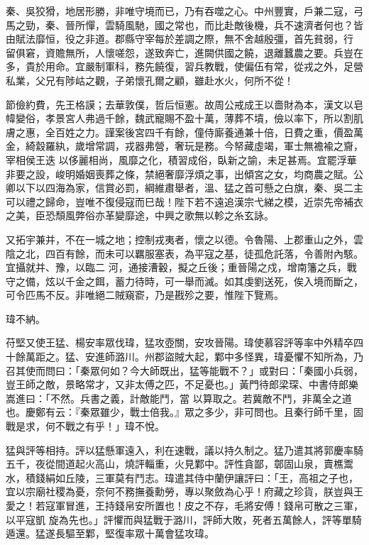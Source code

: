 \begin{pinyinscope}
 秦、吳狡猾，地居形勝，非唯守境而已，乃有吞噬之心。中州豐實，戶兼二寇，弓馬之勁，秦、晉所憚，雲騎風馳，國之常也，而比赴敵後機，兵不速濟者何也？皆由賦法靡恒，役之非道。郡縣守宰每於差調之際，無不舍越殷彊，首先貧弱，行
 留俱窘，資贍無所，人懷嗟怨，遂致奔亡，進闕供國之饒，退離蠶農之要。兵豈在多，貴於用命。宜嚴制軍科，務先饒復，習兵教戰，使偏伍有常，從戎之外，足營私業，父兄有陟岵之觀，子弟懷孔爾之顧，雖赴水火，何所不從！



 節儉約費，先王格謨；去華敦僕，哲后恒憲。故周公戒成王以嗇財為本，漢文以皂幃變俗，孝景宮人弗過千餘，魏武寵賜不盈十萬，薄葬不墳，儉以率下，所以割肌膚之惠，全百姓之力。謹案後宮四千有餘，僮侍廝養通兼十倍，日費之重，價盈萬金，綺縠羅紈，歲增常調，戎器弗營，奢玩是務。今帑藏虛竭，軍士無襜褕之齎，宰相侯王迭
 以侈麗相尚，風靡之化，積習成俗，臥新之諭，未足甚焉。宜罷浮華非要之設，峻明婚姻喪葬之條，禁絕奢靡浮煩之事，出傾宮之女，均商農之賦。公卿以下以四海為家，信賞必罰，綱維肅舉者，溫、猛之首可懸之白旗，秦、吳二主可以禮之歸命，豈唯不復侵寇而巳哉！陛下若不遠追漢宗弋綈之模，近崇先帝補衣之美，臣恐頹風弊俗亦革變靡途，中興之歌無以軫之糸玄詠。



 又拓宇兼并，不在一城之地；控制戎夷者，懷之以德。令魯陽、上郡重山之外，雲陰之北，四百有餘，而未可以羈服塞表，為平寇之基，徒孤危託落，令善附內駭。宜攝就并、豫，以臨二
 河，通接漕轂，擬之丘後；重晉陽之戍，增南籓之兵，戰守之備，炫以千金之餌，蓄力待時，可一舉而滅。如其虔劉送死，俟入境而斷之，可令匹馬不反。非唯絕二賊窺窬，乃是戡殄之要，惟陛下覽焉。



 瑋不納。



 苻堅又使王猛、楊安率眾伐瑋，猛攻壺關，安攻晉陽。瑋使慕容評等率中外精卒四十餘萬距之。猛、安進師潞川。州郡盜賊大起，鄴中多怪異，瑋憂懼不知所為，乃召其使而問曰：「秦眾何如？今大師既出，猛等能戰不？」或對曰：「秦國小兵弱，豈王師之敵，景略常才，又非太傅之匹，不足憂也。」黃門待郎梁琛、中書侍郎樂嵩進曰：「不然。兵書之義，計敵能鬥，當
 以算取之。若冀敵不鬥，非萬全之道也。慶鄭有云：『秦眾雖少，戰士倍我。』眾之多少，非可問也。且秦行師千里，固戰是求，何不戰之有乎！」瑋不悅。



 猛與評等相持。評以猛懸軍遠入，利在速戰，議以持久制之。猛乃遣其將郭慶率騎五千，夜從間道起火高山，燒評輜重，火見鄴中。評性貪鄙，鄣固山泉，賣樵鬻水，積錢絹如丘陵，三軍莫有鬥志。瑋遣其侍中蘭伊讓評曰：「王，高祖之子也，宜以宗廟社稷為憂，奈何不務撫養勳勞，專以聚斂為心乎！府藏之珍貨，朕豈與王愛之！若寇軍冒進，王持錢帛安所置也！皮之不存，毛將安傅！錢帛可散之三軍，以平寇凱
 旋為先也。」評懼而與猛戰于潞川，評師大敗，死者五萬餘人，評等單騎遁還。猛遂長驅至鄴，堅復率眾十萬會猛攻瑋。




\end{pinyinscope}
